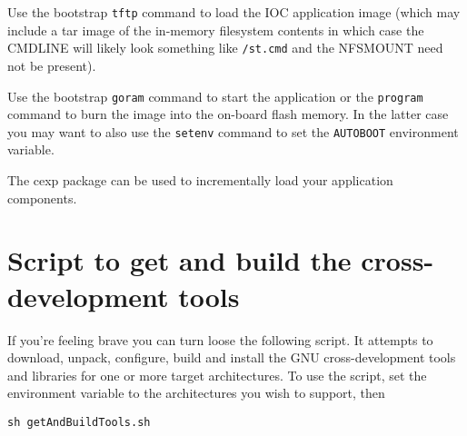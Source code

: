 \documentclass{report}
\begin{document}
Use the bootstrap {\tt tftp} command to load the IOC application image
(which may include a tar image of the in-memory filesystem contents in which case the CMDLINE will likely look something like {\tt /st.cmd} and the NFSMOUNT need not be present).

Use the bootstrap {\tt goram} command to start the application or the
{\tt program} command to burn the image into the on-board flash memory.  In
the latter case you may want to also use the {\tt setenv} command to set the
{\tt AUTOBOOT} environment variable.

The cexp package can be used to
incrementally load your application components.


\appendix
\chapter{Script to get and build the cross-development tools}
\label{getAndBuildTools}
If you're feeling brave you can turn loose the following script.  It attempts
to download, unpack, configure, build and install the GNU cross-development
tools and libraries for one or more target architectures.  To use
the script, set the \verb@ARCHS@ 
environment variable to the architectures you wish to support, then 
\begin{verbatim}
sh getAndBuildTools.sh
\end{verbatim}
\end{document}
